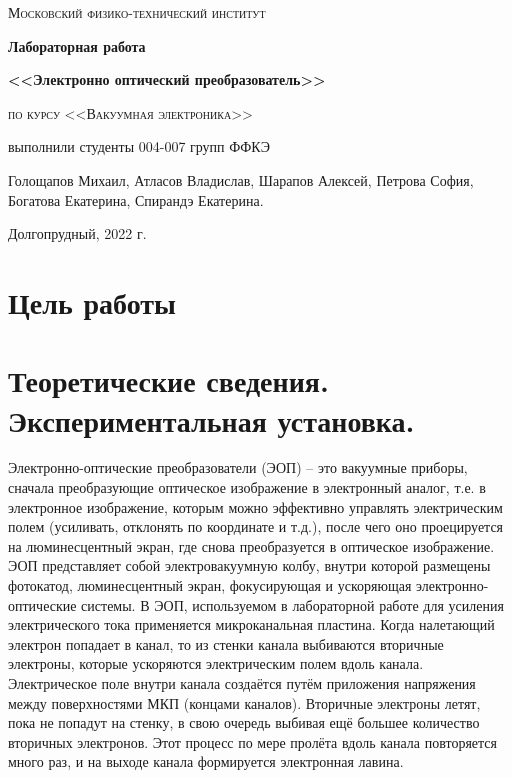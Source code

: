 \documentclass[a4paper,12pt]{article}
\theoremstyle{plain} %
\theoremstyle{definition} %
\theoremstyle{remark} %
\begin{document}
\begin{titlepage}
	\centering
	\vspace{5cm}
	{\scshape\LARGE Московский физико-технический институт \par}
	\vspace{5cm}
	{\huge\bfseries Лабораторная работа \par}
	\vspace{0.5cm}
	{\huge\bfseries <<Электронно оптический преобразователь>> \par}
	\vspace{1cm}
	{\scshape\Large по курсу <<Вакуумная электроника>>\par}
	\vspace{1cm}
	\vfill
	
\begin{flushright}
	{\large выполнили студенты 004-007 групп ФФКЭ}\par
	\vspace{0.3cm}
	{\LARGE Голощапов Михаил, Атласов Владислав, Шарапов Алексей, Петрова София, Богатова Екатерина, Спирандэ Екатерина.} \par
\end{flushright}

	\vfill
	Долгопрудный, 2022 г.
\end{titlepage}

	\newpage
	\section{Цель работы}
	
	\section{Теоретические сведения. Экспериментальная установка.}
	Электронно-оптические преобразователи (ЭОП) – это вакуумные приборы, сначала преобразующие оптическое изображение в электронный аналог, т.е. в электронное изображение, которым можно эффективно управлять электрическим полем (усиливать, отклонять по координате и т.д.), после чего оно проецируется на люминесцентный экран, где снова преобразуется в оптическое изображение. \\
	
ЭОП представляет собой электровакуумную колбу, внутри которой размещены фотокатод, люминесцентный экран,  фокусирующая и ускоряющая электронно-оптические системы. В ЭОП, используемом в лабораторной работе для усиления электрического тока применяется микроканальная пластина.
Когда налетающий электрон попадает в канал, то из стенки канала выбиваются вторичные электроны, которые ускоряются электрическим полем вдоль канала. Электрическое поле внутри канала создаётся путём приложения напряжения между поверхностями МКП (концами каналов). Вторичные электроны летят, пока не попадут на стенку, в свою очередь выбивая ещё большее количество вторичных электронов. Этот процесс по мере пролёта вдоль канала повторяется много раз, и на выходе канала формируется электронная лавина.\\
\end{document}
